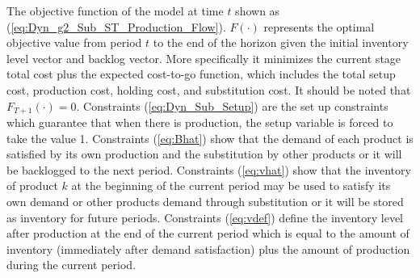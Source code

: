 \documentclass[11pt]{article}
\newcommand{\ti}{t} %
\newcommand{\Ti}{T}
\newcommand{\ka}{k} %
\newcommand{\KA}{\mathcal{K}}
\newcommand{\Bi}{B} %
\newcommand{\Vi}{v} %
\newcommand{\Es}{S} %
\newcommand{\InvPos}{inventory level after production }
\newcommand{\cn}{\mathcal{C}(n) }
\newcommand{\cred}{\color{black}}
\begin{document}



 The objective function of the model at time $\ti$ shown as (\ref{eq:Dyn_g2_Sub_ST_Production_Flow}). $F(\cdot) $ represents the optimal objective value from period $\ti$ to the end of the horizon given the initial inventory level vector and backlog vector. More specifically it minimizes the current stage total cost plus the expected cost-to-go function, which includes the total setup cost, production cost, holding cost, and substitution cost. 
 {\cred It should be noted that $F_{\Ti+1}(\cdot) =0$.}
Constraints (\ref{eq:Dyn_Sub_Setup}) are the set up constraints which guarantee that when there is production, the setup variable is forced to take the value 1. 
Constraints (\ref{eq:Bhat}) show that the demand of each product is satisfied by its own production and the substitution by other products or it will be backlogged to the next period.
Constraints (\ref{eq:vhat}) show that the inventory of product $\ka$ at the beginning of the current period may be used to satisfy its own demand or other products demand through substitution or it will be stored as inventory for future periods. 
Constraints (\ref{eq:vdef}) define the \InvPos at the end of the current period which is equal to the amount of inventory (immediately after demand satisfaction) plus the amount of production during the current period.
\end{document}

